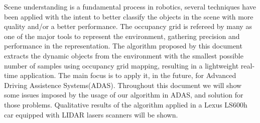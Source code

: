 Scene understanding is a fundamental process in robotics, several techniques have been applied with the intent to better classify the objects in the scene with more quality and/or a better performance. The occupancy grid is refereed by many as one of the major tools to represent the environment, gathering precision and performance in the representation. The algorithm proposed by this document extracts the dynamic objects from the environment with the smallest possible number of samples using occupancy grid mapping, resulting in a lightweight real-time application. The main focus is to apply it, in the future, for  Advanced Driving Assistence Systems(ADAS). Throughout this document we will show some issues imposed by the usage of our algorithm in ADAS, and solution for those problems. Qualitative results of the algorithm applied in a Lexus LS600h car equipped with LIDAR lasers scanners will be shown.


